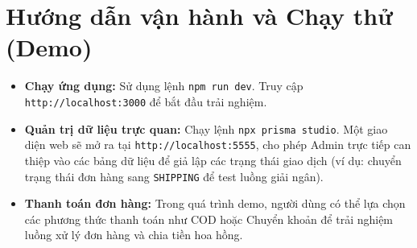 \documentclass[../main.tex]{subfiles}
\begin{document}
\section{Hướng dẫn vận hành và Chạy thử (Demo)}
\begin{itemize}
    \item \textbf{Chạy ứng dụng:} Sử dụng lệnh \texttt{npm run dev}. Truy cập \texttt{http://localhost:3000} để bắt đầu trải nghiệm.
    \item \textbf{Quản trị dữ liệu trực quan:} Chạy lệnh \texttt{npx prisma studio}. Một giao diện web sẽ mở ra tại \texttt{http://localhost:5555}, cho phép Admin trực tiếp can thiệp vào các bảng dữ liệu để giả lập các trạng thái giao dịch (ví dụ: chuyển trạng thái đơn hàng sang \texttt{SHIPPING} để test luồng giải ngân).
    \item \textbf{Thanh toán đơn hàng:} Trong quá trình demo, người dùng có thể lựa chọn các phương thức thanh toán như COD hoặc Chuyển khoản để trải nghiệm luồng xử lý đơn hàng và chia tiền hoa hồng.
\end{itemize}
\end{document}
